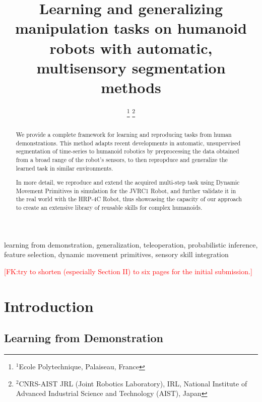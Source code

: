 \documentclass[conference]{IEEEtran}
\newcommand{\fk}[1]{\textcolor{red}{[FK:#1]}}
\begin{document}
\title{\textbf{Learning and generalizing manipulation tasks on humanoid robots with automatic, multisensory segmentation methods}
}

\author{
\IEEEauthorblockA{}
\and
{}
\IEEEauthorblockA{}
\thanks{$^{1}$Ecole Polytechnique, Palaiseau, France}
\thanks{$^{2}$CNRS-AIST JRL (Joint Robotics Laboratory), IRL, National Institute of Advanced Industrial Science and Technology (AIST), Japan}
}

\maketitle

\begin{abstract}
We provide a complete framework for learning and reproducing tasks from human demonstrations. This method adapts recent developments in automatic, unsupervised segmentation of time-series to humanoid robotics by preprocessing the data obtained from a broad range of the robot's sensors, to then repropduce and generalize the learned task in similar environments.

In more detail,  we reproduce and extend the acquired multi-step task using Dynamic Movement Primitives in simulation for the JVRC1 Robot, and further validate it in the real world with the HRP-4C Robot, thus showcasing the capacity of our approach to create an extensive library of reusable skills for complex humanoids.
\end{abstract}

\begin{IEEEkeywords}
learning from demonstration, generalization, teleoperation, probabilistic inference, feature selection, dynamic movement primitives, sensory skill integration
\end{IEEEkeywords}

\fk{try to shorten (especially Section II) to six pages for the initial submission.}
\section{Introduction}
\subsection{Learning from Demonstration}
\end{document}
